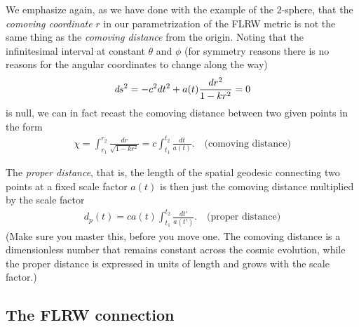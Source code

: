 We emphasize again, as we have done with the example of the 2-sphere, that the
\emph{comoving coordinate} $r$ in our parametrization of the FLRW metric is not
the same thing as the \emph{comoving distance} from the origin. Noting that the
infinitesimal interval at constant $\theta$ and $\phi$ (for symmetry reasons there
is no reasons for the angular coordinates to change along the way)
\begin{align*}
  \emph{d}s^2 = -c^2 dt^2 + a(t) \frac{dr^2}{1 - kr^2} = 0
\end{align*}
is null, we can in fact recast the comoving distance between two given points in the
form
\begin{align}
  \chi = \int_{r_1}^{r_2} \frac{dr}{\sqrt{1 - kr^2}} =
  c \int_{t_1}^{t_2} \frac{dt}{a(t)}. \quad\text{(comoving distance)}
\end{align}

The \emph{proper distance}, that is, the length of the spatial geodesic connecting
two points at a fixed scale factor $a(t)$ is then just the comoving distance multiplied
by the scale factor
\begin{align}
  d_p(t) = c a(t) \int_{t_1}^{t_2} \frac{dt'}{a(t')}. \quad\text{(proper distance)}
\end{align}
(Make sure you master this, before you move one. The comoving distance is a dimensionless
number that remains constant across the cosmic evolution, while the proper distance
is expressed in units of length and grows with the scale factor.)



\subsection{The FLRW connection}

